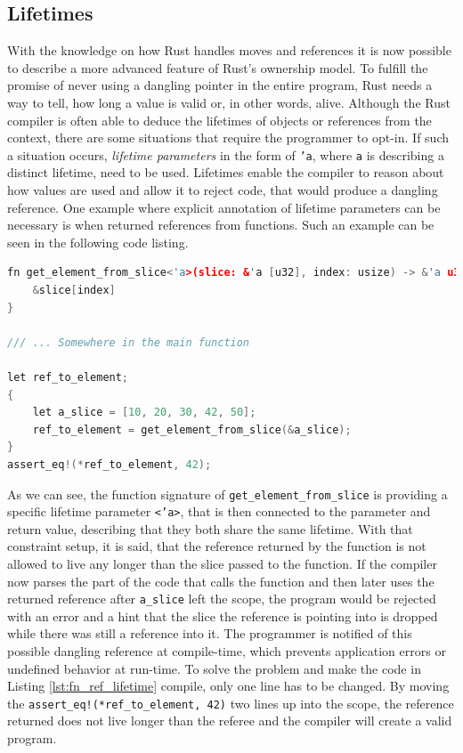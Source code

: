 \subsection{Lifetimes}

With the knowledge on how Rust handles moves and references it is now possible to describe a more advanced feature of Rust's ownership model. To fulfill the promise of never using a dangling pointer in the entire program, Rust needs a way to tell, how long a value is valid or, in other words, alive. Although the Rust compiler is often able to deduce the lifetimes of objects or references from the context, there are some situations that require the programmer to opt-in. If such a situation occurs, \textit{lifetime parameters} in the form of \texttt{'a}, where \texttt{a} is describing a distinct lifetime, need to be used. Lifetimes enable the compiler to reason about how values are used and allow it to reject code, that would produce a dangling reference. One example where explicit annotation of lifetime parameters can be necessary is when returned references from functions. Such an example can be seen in the following code listing.\\

\begin{lstlisting}[caption={Returning a reference from a function, needing an explicit lifetime annotation. Compilation error because of a possible dangling reference.}, label={lst:fn_ref_lifetime}, language=C++]
fn get_element_from_slice<'a>(slice: &'a [u32], index: usize) -> &'a u32 {
	&slice[index]
}

/// ... Somewhere in the main function

let ref_to_element;
{
	let a_slice = [10, 20, 30, 42, 50];
	ref_to_element = get_element_from_slice(&a_slice);
}
assert_eq!(*ref_to_element, 42);

\end{lstlisting}

\noindent
As we can see, the function signature of \texttt{get\_element\_from\_slice} is providing a specific lifetime parameter \texttt{<'a>}, that is then connected to the parameter and return value, describing that they both share the same lifetime. With that constraint setup, it is said, that the reference returned by the function is not allowed to live any longer than the slice passed to the function. If the compiler now parses the part of the code that calls the function and then later uses the returned reference after \texttt{a\_slice} left the scope, the program would be rejected with an error and a hint that the slice the reference is pointing into is dropped while there was still a reference into it. The programmer is notified of this possible dangling reference at compile-time, which prevents application errors or undefined behavior at run-time. To solve the problem and make the code in Listing \ref{lst:fn_ref_lifetime} compile, only one line has to be changed. By moving the \texttt{assert\_eq!(*ref\_to\_element, 42)} two lines up into the scope, the reference returned does not live longer than the referee and the compiler will create a valid program.


